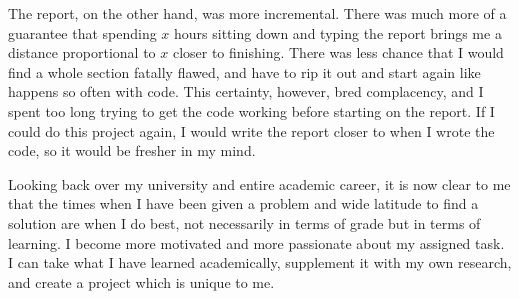 \documentclass{article}
\begin{document}
The report, on the other hand, was more incremental. There was much more of a guarantee that spending \( x \) hours sitting down and typing the report brings me a distance proportional to \( x \) closer to finishing. There was less chance that I would find a whole section fatally flawed, and have to rip it out and start again like happens so often with code. This certainty, however, bred complacency, and I spent too long trying to get the code working before starting on the report. If I could do this project again, I would write the report closer to when I wrote the code, so it would be fresher in my mind.

Looking back over my university and entire academic career, it is now clear to me that the times when I have been given a problem and wide latitude to find a solution are when I do best, not necessarily in terms of grade but in terms of learning. I become more motivated and more passionate about my assigned task. I can take what I have learned academically, supplement it with my own research, and create a project which is unique to me.
\end{document}
